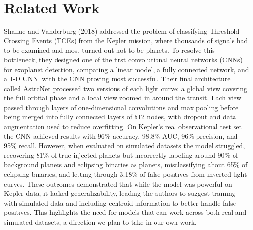 \documentclass[letterpaper]{article}
\begin{document}
\section*{Related Work}
Shallue and Vanderburg (2018) addressed the problem of classifying Threshold Crossing Events (TCEs) from the Kepler mission, where thousands of signals had to be examined and most turned out not to be planets. To resolve this bottleneck, they designed one of the first convolutional neural networks (CNNs) for exoplanet detection, comparing a linear model, a fully connected network, and a 1-D CNN, with the CNN proving most successful. Their final architecture called AstroNet processed two versions of each light curve: a global view covering the full orbital phase and a local view zoomed in around the transit. Each view passed through layers of one-dimensional convolutions and max pooling before being merged into fully connected layers of 512 nodes, with dropout and data augmentation used to reduce overfitting. On Kepler’s real observational test set the CNN achieved results with 96\% accuracy, 98.8\% AUC, 96\% precision, and 95\% recall. However, when evaluated on simulated datasets the model struggled, recovering 81\% of true injected planets but incorrectly labeling around 90\% of background planets and eclipsing binaries as planets, misclassifying about 65\% of eclipsing binaries, and letting through 3.18\% of false positives from inverted light curves. These outcomes demonstrated that while the model was powerful on Kepler data, it lacked generalizability, leading the authors to suggest training with simulated data and including centroid information to better handle false positives. This highlights the need for models that can work across both real and simulated datasets, a direction we plan to take in our own work.
\end{document}
